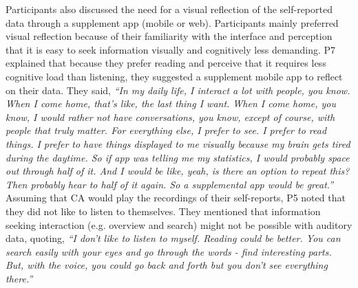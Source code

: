         



        Participants also discussed the need for a visual reflection of the self-reported data through a supplement app (mobile or web). Participants mainly preferred visual reflection because of their familiarity with the interface and perception that it is easy to seek information visually and cognitively less demanding.
        P7 explained that because they prefer reading and perceive that it requires less cognitive load than listening, they suggested a supplement mobile app to reflect on their data. They said,
		\textit{``In my daily life, I interact a lot with people, you know. 
		When I come home, that's like, the last thing I want. When I come home, you know, I would rather not have conversations, you know, except of course, with people that truly matter. For everything else, I prefer to see. I prefer to read things. I prefer to have things displayed to me visually because my brain gets tired during the daytime. So if \acl{app} was telling me my statistics, I would probably space out through half of it. And I would be like, yeah, is there an option to repeat this? Then probably hear to half of it again. So a supplemental app would be great.''}
        Assuming that \acl{CA} would play the recordings of their self-reports, P5 noted that they did not like to listen to themselves. They mentioned that information seeking interaction (e.g. overview and search) might not be possible with auditory data, quoting, 
        \textit{``I don’t like to listen to myself. Reading could be better. You can search easily with your eyes and go through the words - find interesting parts. But, with the voice, you could go back and forth but you don’t see everything there.''}


